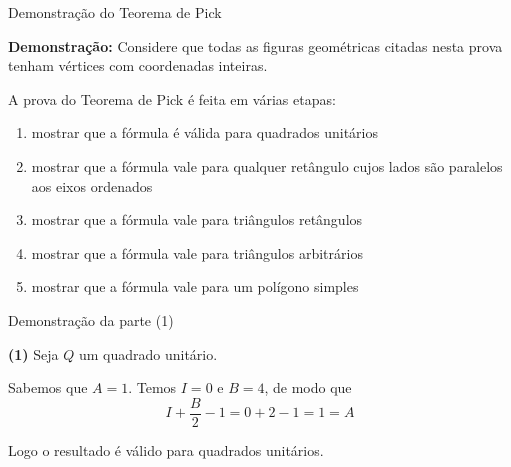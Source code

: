 \begin{frame}[fragile]{Demonstração do Teorema de Pick}

    \textbf{Demonstração:} Considere que todas as figuras geométricas citadas nesta prova
         tenham vértices com coordenadas inteiras.
        \pause

        A prova do Teorema de Pick é feita em várias etapas:
        \pause
        \begin{enumerate}[(1)]
            \item mostrar que a fórmula é válida para quadrados unitários
        \pause
            \item mostrar que a fórmula vale para qualquer retângulo cujos lados são paralelos
                aos eixos ordenados
        \pause
            \item mostrar que a fórmula vale para triângulos retângulos
        \pause
            \item mostrar que a fórmula vale para triângulos arbitrários
        \pause
            \item mostrar que a fórmula vale para um polígono simples
        \end{enumerate}
\end{frame}

\begin{frame}[fragile]{Demonstração da parte (1)}

    \textbf{(1)} Seja $Q$ um quadrado unitário.

    \begin{figure}
        \centering

    \end{figure}
        \pause

    Sabemos que $A = 1$. Temos $I = 0$ e $B = 4$, de modo que
    \[
         I + \frac{B}{2} - 1 = 0 + 2 - 1 = 1 = A
    \]
        \pause

    Logo o resultado é válido para quadrados unitários.
\end{frame}

